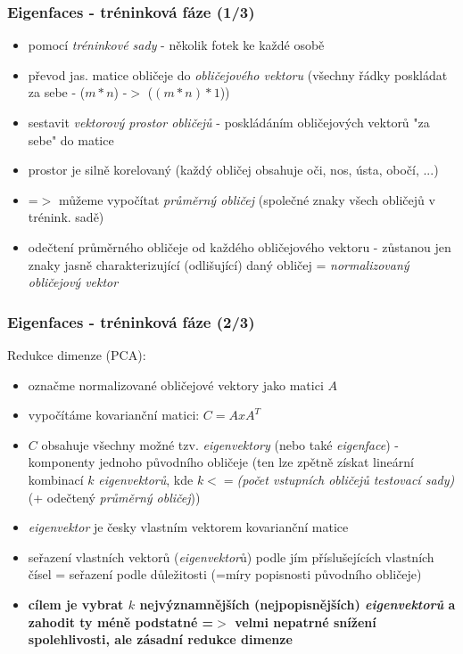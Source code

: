 \documentclass{beamer}
\begin{document}
\begin{frame}
\frametitle{Eigenfaces - tréninková fáze (1/3)}
\begin{itemize}
\tiny
			\item pomocí \textit{tréninkové sady} - několik fotek ke každé osobě
			\item převod jas. matice obličeje do \textit{obličejového vektoru} (všechny řádky poskládat za sebe - ($m*n$) -$>$ ($(m*n)*1$)) 
			\item sestavit \textit{vektorový prostor obličejů} - poskládáním obličejových vektorů "za sebe" do matice
			\item prostor je silně korelovaný (každý obličej obsahuje oči, nos, ústa, obočí, ...)
			\item =$>$ můžeme vypočítat \textit{průměrný obličej} (společné znaky všech obličejů v trénink. sadě)
			\item odečtení průměrného obličeje od každého obličejového vektoru - zůstanou jen znaky jasně charakterizující (odlišující) daný obličej = \textit{normalizovaný obličejový vektor}
			\end{itemize}

\end{frame}

\begin{frame}
\frametitle{Eigenfaces - tréninková fáze (2/3)}
Redukce dimenze (PCA):
			\begin{itemize}
			\tiny
			\item označme normalizované obličejové vektory jako matici $A$
			\item vypočítáme kovarianční matici: $C=AxA^T$
			\item $C$ obsahuje všechny možné tzv. \textit{eigenvektory} (nebo také \textit{eigenface}) - komponenty jednoho původního obličeje (ten lze zpětně získat lineární kombinací $k$ \textit{eigenvektorů}, kde $k<=$\textit{(počet vstupních obličejů testovací sady)} (+ odečtený \textit{průměrný obličej}))
			\item \textit{eigenvektor} je česky vlastním vektorem kovarianční matice
			\item seřazení vlastních vektorů (\textit{eigenvektor}ů) podle jím příslušejících vlastních čísel = seřazení podle důležitosti (=míry popisnosti původního obličeje)
			\item \textbf{cílem je vybrat $k$ nejvýznamnějších (nejpopisnějších) \textit{eigenvektorů} a zahodit ty méně podstatné =$>$ velmi nepatrné snížení spolehlivosti, ale zásadní redukce dimenze}
		\end{itemize}

\end{frame}
\end{document}
